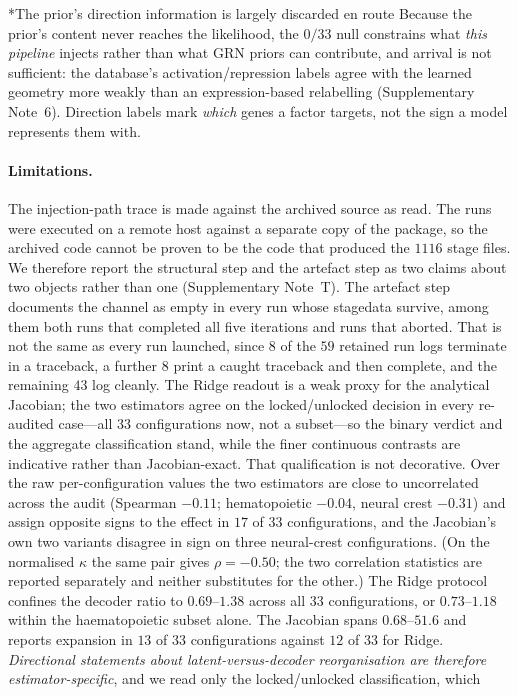 \documentclass[11pt,a4paper]{article}
\makeatletter
\renewcommand{\subsection}{\@startsection{subsection}{2}{0pt}{10pt plus 4pt}{4pt}{\normalsize\bfseries}}
\makeatother
\begin{document}
\subsection*{The prior's direction information is largely discarded en route}
Because the prior's content never reaches the likelihood, the $0/33$ null constrains what
\emph{this pipeline} injects rather than what GRN priors can contribute, and arrival is not
sufficient: the database's activation/repression labels agree with the learned geometry more
weakly than an expression-based relabelling (Supplementary Note~6). Direction labels mark
\emph{which} genes a factor targets, not the sign a model represents them with.

\paragraph*{Limitations.}
The injection-path trace is made against the archived source as read. The runs were executed on a remote host against a separate copy of the package, so the archived code cannot be proven to be the code that produced the $1116$ stage files. We therefore report the structural step and the artefact step as two claims about two objects rather than one (Supplementary Note~T). The artefact step documents the channel as empty in every run whose stagedata survive, among them both runs that completed all five iterations and runs that aborted. That is not the same as every run launched, since $8$ of the $59$ retained run logs terminate in a traceback, a further $8$ print a caught traceback and then complete, and the remaining $43$ log cleanly.
The Ridge readout is a weak proxy for the analytical Jacobian; the two estimators agree on the
locked/unlocked decision in every re-audited case---all $33$ configurations now, not a
subset---so the binary verdict and the aggregate
classification stand, while the finer continuous contrasts are indicative rather than
Jacobian-exact. That qualification is not decorative. Over the raw per-configuration values the two
estimators are close to uncorrelated across the audit (Spearman $-0.11$; hematopoietic $-0.04$,
neural crest $-0.31$) and assign opposite signs to the effect in $17$ of $33$ configurations, and
the Jacobian's own two variants disagree in sign on three neural-crest configurations. (On the normalised $\kappa$ the same pair gives $\rho=-0.50$; the two correlation statistics are reported separately and neither substitutes for the other.) The Ridge protocol confines the decoder ratio to $0.69$--$1.38$ across all 33 configurations, or $0.73$--$1.18$ within the haematopoietic subset alone. The Jacobian spans $0.68$--$51.6$ and reports expansion in $13$ of $33$ configurations against $12$ of $33$ for Ridge. \emph{Directional statements about latent-versus-decoder reorganisation are
therefore estimator-specific}, and we read only the locked/unlocked classification, which
\end{document}
